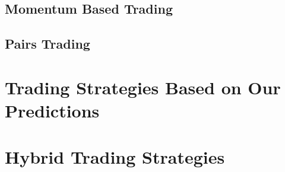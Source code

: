 \subsection{Momentum Based Trading}


\subsection{Pairs Trading}



\section{Trading Strategies Based on Our Predictions}



\section{Hybrid Trading Strategies}



